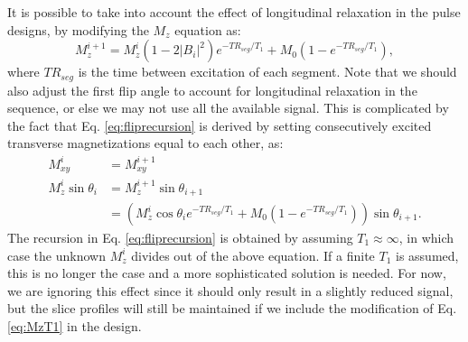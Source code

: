 \documentclass[11pt]{article}
\begin{document}
\par It is possible to take into account the effect of longitudinal relaxation in the pulse designs, 
by modifying the $M_z$ equation as:
\begin{equation}
M_z^{i+1} = M_z^i \left( 1 - 2 \vert B_i \vert^2\right)e^{-TR_{seg}/T_1} + M_0\left(1 - e^{-TR_{seg}/T_1}\right),
\label{eq:MzT1}
\end{equation}
where $TR_{seg}$ is the time between excitation of each segment. 
Note that we should also adjust the first flip angle to account for longitudinal relaxation in the sequence,
or else we may not use all the available signal. 
This is complicated by the fact that Eq. \ref{eq:fliprecursion} is derived by setting consecutively excited transverse magnetizations equal to each
other, as:
\begin{align}
M_{xy}^{i} &= M_{xy}^{i+1} \\
M_z^{i}\sin \theta_{i} &= M_z^{i+1}\sin \theta_{i+1} \\
				&= \left(M_z^{i}\cos \theta_{i} e^{-TR_{seg}/T_1} + M_0\left(1-e^{-TR_{seg}/T_1}\right)\right) \sin \theta_{i+1}.
\end{align}
The recursion in Eq. \ref{eq:fliprecursion} is obtained by assuming $T_1 \approx \infty$, 
in which case the unknown $M_z^i$ divides out of the above equation.
If a finite $T_1$ is assumed, this is no longer the case and a more sophisticated solution is needed.
For now, we are ignoring this effect since it should only result in a slightly reduced signal, 
but the slice profiles will still be maintained if we include the modification of Eq. \ref{eq:MzT1} in the design. 
\end{document}
